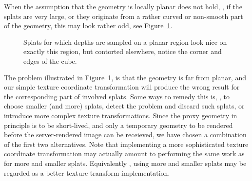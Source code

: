 When the assumption that the geometry is locally planar does not hold, \eg, if
the splats are very large, or they originate from a rather curved or non-smooth
part of the geometry, this may look rather odd, see
Figure~\ref{fig:LargeSplatsOnCorners}.

\begin{figure}[htb]
  \centering
  \caption{\label{fig:LargeSplatsOnCorners}
           Splats for which depths are sampled on a planar region look nice on
  exactly this region, but contorted elsewhere, notice the corner and edges of
  the cube.}
\end{figure}

The problem illustrated in Figure~\ref{fig:LargeSplatsOnCorners}, is that the
geometry is far from planar, and our simple texture coordinate transformation
will produce the wrong result for the corresponding part of involved
splats. Some ways to remedy this is, \eg, to choose smaller (and more) splats,
detect the problem and discard such splats, or introduce more complex texture
transformations. Since the proxy geometry in principle is to be short-lived, and
only a temporary geometry to be rendered before the server-rendered image can be
receieved, we have chosen a combination of the first two alternatives. Note that
implementing a more sophisticated texture coordinate transformation may actually
amount to performing the same work as for more and smaller splats. Equivalently
, using more and smaller splats may be regarded as a better texture transform
implementation.


